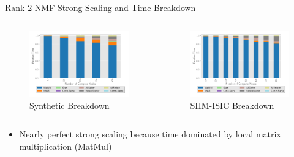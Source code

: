 \documentclass{beamer}
\newcommand{\image}{SIIM-ISIC}
\begin{document}
\begin{frame}{Rank-2 NMF Strong Scaling and Time Breakdown}
\begin{columns}
    \end{columns}
\vspace{-.5cm}
    \begin{columns}
        \begin{column}{0.5\textwidth}
            \begin{figure}
            \includegraphics[width=\figscal]{../plots/synthetic_rank2_strongscaling.pdf}
            \caption{Synthetic Breakdown}
            \end{figure}
        \end{column}
        \begin{column}{0.5\textwidth}
            \begin{figure}
            \includegraphics[width=\figscal]{../plots/realworld_rank2_strongscaling.pdf}
            \caption{\image{} Breakdown}
            \end{figure}
        \end{column}
    \end{columns}
    
\begin{itemize}
\small
    \item Nearly perfect strong scaling because time dominated by local matrix multiplication (MatMul)
\end{itemize}
    
\end{frame}
\end{document}
